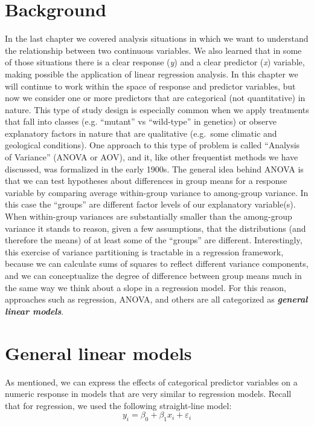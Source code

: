 \documentclass[]{book}
\begin{document}
\hypertarget{background-7}{%
\section{Background}\label{background-7}}

In the last chapter we covered analysis situations in which we want to understand the relationship between two continuous variables. We also learned that in some of those situations there is a clear response (\emph{y}) and a clear predictor (\emph{x}) variable, making possible the application of linear regression analysis. In this chapter we will continue to work within the space of response and predictor variables, but now we consider one or more predictors that are categorical (not quantitative) in nature. This type of study design is especially common when we apply treatments that fall into classes (e.g. ``mutant'' vs ``wild-type'' in genetics) or observe explanatory factors in nature that are qualitative (e.g.~some climatic and geological conditions). One approach to this type of problem is called ``Analysis of Variance'' (ANOVA or AOV), and it, like other frequentist methods we have discussed, was formalized in the early 1900s. The general idea behind ANOVA is that we can test hypotheses about differences in group means for a response variable by comparing average within-group variance to among-group variance. In this case the ``groups'' are different factor levels of our explanatory variable(s). When within-group variances are substantially smaller than the among-group variance it stands to reason, given a few assumptions, that the distributions (and therefore the means) of at least some of the ``groups'' are different. Interestingly, this exercise of variance partitioning is tractable in a regression framework, because we can calculate sums of squares to reflect different variance components, and we can conceptualize the degree of difference between group means much in the same way we think about a slope in a regression model. For this reason, approaches such as regression, ANOVA, and others are all categorized as \textbf{\emph{general linear models}}.

\hypertarget{general-linear-models}{%
\section{General linear models}\label{general-linear-models}}

As mentioned, we can express the effects of categorical predictor variables on a numeric response in models that are very similar to regression models. Recall that for regression, we used the following straight-line model:
\[y_i=\beta_0+\beta_1x_i+\varepsilon_i\]
\end{document}
